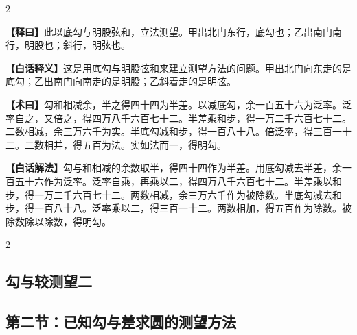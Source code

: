 \documentclass[11pt,a4paper]{article}
\newcommand{\WenExplain}{\textcolor{classicalcolor}{\textbf{【释曰】}}}
\newcommand{\BaiExplain}{\textcolor{moderncolor}{\textbf{【白话释义】}}}
\newcommand{\WenMethod}{\textcolor{classicalcolor}{\textbf{【术曰】}}}
\newcommand{\BaiMethod}{\textcolor{moderncolor}{\textbf{【白话解法】}}}
\begin{document}
\begin{paracol}{2}
\switchcolumn*
\begin{tcolorbox}[colback=red!5,colframe=red!30!black,boxrule=0.3pt]
\WenExplain\quad 此以底勾与明股弦和，立法测望。甲出北门东行，底勾也；乙出南门南行，明股也；斜行，明弦也。
\end{tcolorbox}
\switchcolumn
\begin{tcolorbox}[colback=blue!5,colframe=blue!30!black,boxrule=0.3pt]
\BaiExplain\quad 这是用底勾与明股弦和来建立测望方法的问题。甲出北门向东走的是底勾；乙出南门向南走的是明股；乙斜着走的是明弦。
\end{tcolorbox}

\switchcolumn*
\begin{tcolorbox}[colback=red!5,colframe=red!40!black,boxrule=0.3pt]
\WenMethod\quad 勾和相减余，半之得四十四为半差。以减底勾，余一百五十六为泛率。泛率自之，又倍之，得四万八千六百七十二。半差乘和步，得一万二千六百七十二。二数相减，余三万六千为实。半底勾减和步，得一百八十八。倍泛率，得三百一十二。二数相并，得五百为法。实如法而一，得明勾。
\end{tcolorbox}
\switchcolumn
\begin{tcolorbox}[colback=blue!5,colframe=blue!40!black,boxrule=0.3pt]
\BaiMethod\quad 勾与和相减的余数取半，得四十四作为半差。用底勾减去半差，余一百五十六作为泛率。泛率自乘，再乘以二，得四万八千六百七十二。半差乘以和步，得一万二千六百七十二。两数相减，余三万六千作为被除数。半底勾减去和步，得一百八十八。泛率乘以二，得三百一十二。两数相加，得五百作为除数。被除数除以除数，得明勾。
\end{tcolorbox}

\end{paracol}

\vspace{0.5em}

\begin{paracol}{2}
\subsection*{\textcolor{sectioncolor}{勾与较测望二}}
\switchcolumn
\subsection*{\textcolor{sectioncolor}{第二节：已知勾与差求圆的测望方法}}
\end{paracol}

\vspace{0.5em}
\end{document}
